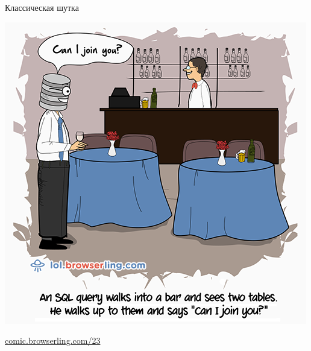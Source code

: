\begin{frame}{Классическая шутка}
	\begin{center}
		\includegraphics[scale=0.4]{join-two-tables.png}

		\href{https://comic.browserling.com/23}{comic.browserling.com/23}
	\end{center}
\end{frame}
